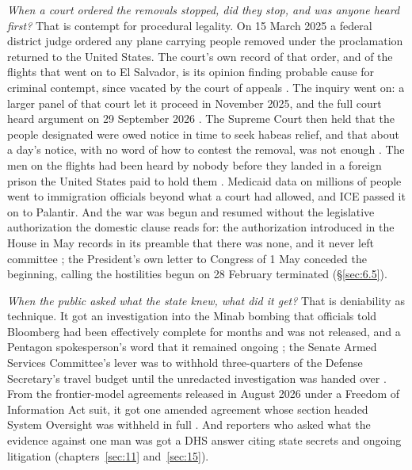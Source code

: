 \emph{When a court ordered the removals stopped, did they stop, and was anyone heard first?} That is contempt for procedural legality. On 15 March 2025 a federal district judge ordered any plane carrying people removed under the proclamation returned to the United States. The court's own record of that order, and of the flights that went on to El Salvador, is its opinion finding probable cause for criminal contempt, since vacated by the court of appeals \autocite{jgg2025contempt}. The inquiry went on: a larger panel of that court let it proceed in November 2025, and the full court heard argument on 29 September 2026 \autocite{thanawala2025contempt,rizzo2026contempt}. The Supreme Court then held that the people designated were owed notice in time to seek habeas relief, and that about a day's notice, with no word of how to contest the removal, was not enough \autocite{jgg2025,aarp2025}. The men on the flights had been heard by nobody before they landed in a foreign prison the United States paid to hold them \autocite{Renteria2025ElSalvador}. Medicaid data on millions of people went to immigration officials beyond what a court had allowed, and ICE passed it on to Palantir. And the war was begun and resumed without the legislative authorization the domestic clause reads for: the authorization introduced in the House in May records in its preamble that there was none, and it never left committee \autocite{hjres176}; the President's own letter to Congress of 1 May conceded the beginning, calling the hostilities begun on 28 February terminated \autocite{cbs2026terminated} (\S\ref{sec:6.5}).

\emph{When the public asked what the state knew, what did it get?} That is deniability as technique. It got an investigation into the Minab bombing that officials told Bloomberg had been effectively complete for months and was not released, and a Pentagon spokesperson's word that it remained ongoing \autocite{Bloomberg2026KillChain,fpj2026minabinquiry}; the Senate Armed Services Committee's lever was to withhold three-quarters of the Defense Secretary's travel budget until the unredacted investigation was handed over \autocite{stassis2026senate}. From the frontier-model agreements released in August 2026 under a Freedom of Information Act suit, it got one amended agreement whose section headed System Oversight was withheld in full \autocite{lasst2026dodai,biddle2026contracts}. And reporters who asked what the evidence against one man was got a DHS answer citing state secrets and ongoing litigation \autocite{Vega2025HernandezRomero} (chapters~\ref{sec:11} and~\ref{sec:15}).

